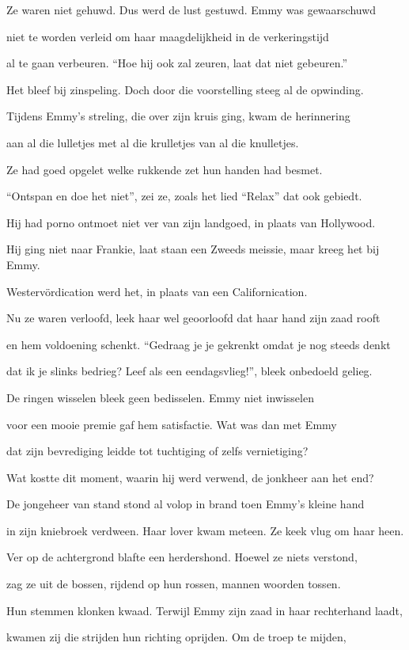 Ze waren niet gehuwd.
Dus werd de lust gestuwd.
Emmy was gewaarschuwd

niet te worden verleid
om haar maagdelijkheid
in de verkeringstijd

al te gaan verbeuren.
“Hoe hij ook zal zeuren,
laat dat niet gebeuren.”

Het bleef bij zinspeling.
Doch door die voorstelling
steeg al de opwinding.

Tijdens Emmy’s streling,
die over zijn kruis ging,
kwam de herinnering

aan al die lulletjes
met al die krulletjes
van al die knulletjes.

Ze had goed opgelet
welke rukkende zet
hun handen had besmet.

“Ontspan en doe het niet”,
zei ze, zoals het lied
“Relax” dat ook gebiedt.

Hij had porno ontmoet
niet ver van zijn landgoed,
in plaats van Hollywood.

Hij ging niet naar Frankie,
laat staan een Zweeds meissie,
maar kreeg het bij Emmy.

Westervördication
werd het, in plaats van een
Californication.

Nu ze waren verloofd,
leek haar wel geoorloofd
dat haar hand zijn zaad rooft

en hem voldoening schenkt.
“Gedraag je je gekrenkt
omdat je nog steeds denkt

dat ik je slinks bedrieg?
Leef als een eendagsvlieg!”,
bleek onbedoeld gelieg.

De ringen wisselen
bleek geen bedisselen.
Emmy niet inwisselen

voor een mooie premie
gaf hem satisfactie.
Wat was dan met Emmy

dat zijn bevrediging
leidde tot tuchtiging
of zelfs vernietiging?

Wat kostte dit moment,
waarin hij werd verwend,
de jonkheer aan het end?

De jongeheer van stand
stond al volop in brand
toen Emmy’s kleine hand

in zijn kniebroek verdween.
Haar lover kwam meteen.
Ze keek vlug om haar heen.

Ver op de achtergrond
blafte een herdershond.
Hoewel ze niets verstond,

zag ze uit de bossen,
rijdend op hun rossen,
mannen woorden tossen.

Hun stemmen klonken kwaad.
Terwijl Emmy zijn zaad
in haar rechterhand laadt,

kwamen zij die strijden
hun richting oprijden.
Om de troep te mijden,

